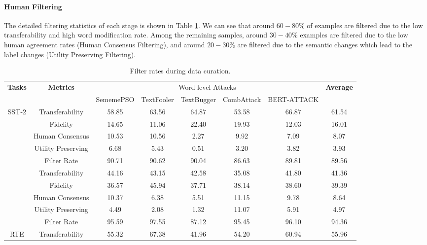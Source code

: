 \documentclass{article}
\begin{document}
\paragraph{Human Filtering} The detailed filtering statistics of each stage is shown in Table \ref{tab:filter}. We can see that around $60-80\%$ of examples are filtered due to the low transferability and high word modification rate. Among the remaining samples, around $30-40\%$ examples are filtered due to the low human agreement rates (Human Consensus Filtering), and around $20-30\%$ are filtered due to the semantic changes which lead to the label changes (Utility Preserving Filtering).


\begin{table}[t]
\small
\centering
    \caption{Filter rates during data curation.}
    \label{tab:filter}
\resizebox{1.0\textwidth}{!}
{
    \begin{tabular}{cc|ccccc|c}
    \toprule
         \multirow{2}{*}{\textbf{Tasks}} & \multirow{2}{*}{\textbf{Metrics}} & \multicolumn{5}{c|}{Word-level Attacks} & \multirow{2}{*}{\textbf{Average}} \\
         \cmidrule(lr){3-7}
         & & SememePSO & TextFooler & TextBugger & CombAttack &  BERT-ATTACK &    \\
        \midrule
          \multirow{6}{*}{SST-2} & Transferability & 58.85 & 63.56 & 64.87 & 53.58 & 66.87 & 61.54 \\
           & Fidelity & 14.65 & 11.06 & 22.40 & 19.93 & 12.03 & 16.01 \\
           & Human Consensus & 10.53 & 10.56 & 2.27 & 9.92 & 7.09 & 8.07 \\
           & Utility Preserving & 6.68 & 5.43 & 0.51 & 3.20 & 3.82 & 3.93 \\
           & Filter Rate & 90.71 & 90.62 & 90.04 & 86.63 & 89.81 & 89.56 \\
           \midrule
           \multirow{6}{*}{MNLI} & Transferability & 44.16 & 43.15 & 42.58 & 35.08 & 41.80 & 41.36 \\
           & Fidelity & 36.57 & 45.94 & 37.71 & 38.14 & 38.60 & 39.39 \\
           & Human Consensus & 10.37 & 6.38 & 5.51 & 11.15 & 9.78 & 8.64 \\
           & Utility Preserving & 4.49 & 2.08 & 1.32 & 11.07 & 5.91 & 4.97 \\
           & Filter Rate & 95.59 & 97.55 & 87.12 & 95.45 & 96.10 & 94.36 \\
           \midrule
           \multirow{6}{*}{RTE} & Transferability & 55.32 & 67.38 & 41.96 & 54.20 & 60.94 & 55.96 \\

\end{tabular}}
\end{table}
\end{document}
